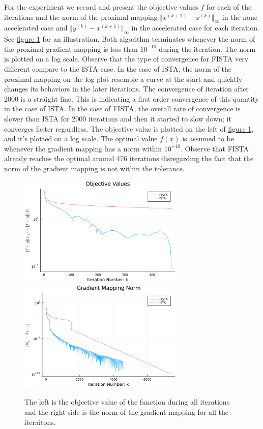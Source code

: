 \documentclass[]{article}
\theoremstyle{definition}
\begin{document}
        For the experiment we record and present the objective values $f$ for each of the iterations and the norm of the proximal mapping $\Vert x^{(k + 1)} - x^{(k)}\Vert_\infty$ in the none accelerated case and $\Vert y^{(k)} - x^{(k + 1)}\Vert_\infty$ in the accelerated case for each iteration. See \hyperref[fig:lasso_1]{figure \ref*{fig:lasso_1}} for an illustration. Both algorithm terminates whenever the norm of the proximal gradient mapping is less than $10^{-10}$ during the iteration. The norm is plotted on a log scale. Observe that the type of convergence for FISTA very different compare to the ISTA case. In the case of ISTA, the norm of the proximal mapping on the log plot resemble a curve at the start and quicktly changes its behaviors in the later iterations. The convergence of iteration after 2000 is a straight line. This is indicating a first order convergence of this quantity in the case of ISTA. In the case of FISTA, the overall rate of convergence is slower than ISTA for 2000 iterations and then it started to slow down; it converges faster regardless. The objective value is plotted on the left of \hyperref[fig:lasso_1]{figure \ref*{fig:lasso_1}}, and it's plotted on a log scale. The optimal value $f(\bar x)$ is assumed to be whenever the gradient mapping has a norm within $10^{-10}$. Observe that FISTA already reaches the optimal around 476 iterations disregarding the fact that the norm of the gradient mapping is not within the tolerance. 
        \begin{figure}[h]
            \centering
            \includegraphics*[width=8cm]{simple_lass_obj.png}
                \includegraphics*[width=8cm]{simple_lass_pgrad.png}
            \caption{The left is the objective value of the function during all iterations and the right side is the norm of the gradient mapping for all the iteraitons. }
            \label{fig:lasso_1}
        \end{figure}
\end{document}
